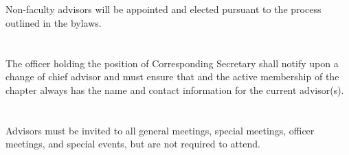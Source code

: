 \section{}
Non-faculty advisors will be appointed and elected pursuant to the process outlined in the bylaws.

\section{}
The officer holding the position of Corresponding Secretary shall notify \hkn upon a change of chief advisor and must ensure that \hkn and the active membership of the chapter always has the name and contact information for the current advisor(s).

\section{}
Advisors must be invited to all general meetings, special meetings, officer meetings, and special events, but are not required to attend.

